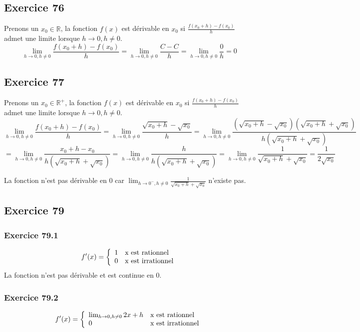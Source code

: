 \documentclass[]{book}
\theoremstyle{definition}
\newcommand{\bb}[1]{\mathbb{#1}}
\newcommand{\R}{\bb{R}}
\begin{document}
\subsection*{Exercice 76}
Prenons un $x_0 \in \R$, la fonction $f(x)$ est d\'erivable en $x_0$ si $\frac{f(x_0+h)-f(x_0)}{h}$ admet une limite lorsque $h \to 0, h \neq 0$.
$$\lim_{h \to 0, h \neq 0} \frac{f(x_0+h)-f(x_0)}{h} = \lim_{h \to 0, h \neq 0} \frac{C-C}{h} = \lim_{h \to 0, h \neq 0} \frac{0}{h} = 0$$


\subsection*{Exercice 77}
Prenons un $x_0 \in \R^{+}$, la fonction $f(x)$ est d\'erivable en $x_0$ si $\frac{f(x_0+h)-f(x_0)}{h}$ admet une limite lorsque $h \to 0, h \neq 0$.
$$\lim_{h \to 0, h \neq 0} \frac{f(x_0+h)-f(x_0)}{h} = \lim_{h \to 0, h \neq 0} \frac{\sqrt{x_0+h}-\sqrt{x_0}}{h} = \lim_{h \to 0, h \neq 0} \frac{(\sqrt{x_0+h}-\sqrt{x_0})(\sqrt{x_0+h}+\sqrt{x_0})}{h(\sqrt{x_0+h}+\sqrt{x_0})}$$
$$= \lim_{h \to 0, h \neq 0} \frac{x_0+h-x_0}{h(\sqrt{x_0+h}+\sqrt{x_0})} = \lim_{h \to 0, h \neq 0} \frac{h}{h(\sqrt{x_0+h}+\sqrt{x_0})} = \lim_{h \to 0, h \neq 0} \frac{1}{\sqrt{x_0+h}+\sqrt{x_0}} = \frac{1}{2\sqrt{x_0}}$$

La fonction n'est pas d\'erivable en 0 car $\lim_{h \to 0^{-}, h \neq 0} \frac{1}{\sqrt{x_0+h}+\sqrt{x_0}}$ n'existe pas.\\


\subsection*{Exercice 79}
\subsubsection*{Exercice 79.1}
$$f'(x) = 
\left\{ 
\begin{array}{l l}
1 & \textrm{x est rationnel}\\
0 & \textrm{x est irrationnel}\\
\end{array}
\right. 
$$
La fonction n'est pas d\'erivable et est continue en 0.

\subsubsection*{Exercice 79.2}
$$f'(x) = 
\left\{ 
\begin{array}{l l}
\lim_{h \to 0, h \neq 0} 2x+h & \textrm{x est rationnel}\\
0 & \textrm{x est irrationnel}\\
\end{array}
\right. 
$$
\end{document}
